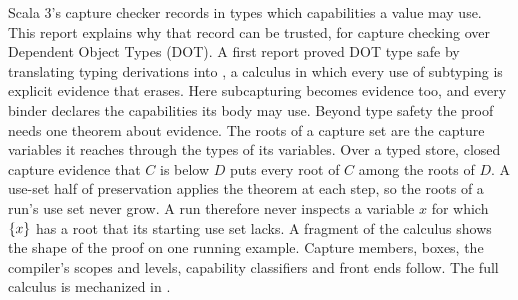 Scala 3's capture checker records in types which capabilities a value may use. This report explains why that record can be trusted, for capture checking over Dependent Object Types (DOT). A first report proved DOT type safe by translating typing derivations into \FCdot, a calculus in which every use of subtyping is explicit evidence that erases. Here subcapturing becomes evidence too, and every binder declares the capabilities its body may use. Beyond type safety the proof needs one theorem about evidence. The roots of a capture set are the capture variables it reaches through the types of its variables. Over a typed store, closed capture evidence that $C$ is below $D$ puts every root of $C$ among the roots of $D$. A use-set half of preservation applies the theorem at each step, so the roots of a run's use set never grow. A run therefore never inspects a variable $x$ for which $\{x\}$ has a root that its starting use set lacks. A fragment of the calculus shows the shape of the proof on one running example. Capture members, boxes, the compiler's scopes and levels, capability classifiers and front ends follow. The full calculus is mechanized in \Lean.
